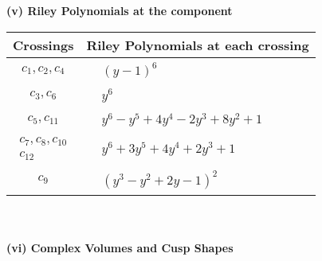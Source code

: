 \documentclass[1p]{elsarticle_modified}
\theoremstyle{definition}
\begin{document}
\newpage\renewcommand{\arraystretch}{1}
\flushleft \textbf{(v) Riley Polynomials at the component}\newline \\
\begin{tabular}{m{50pt}|m{274pt}}
Crossings & \hspace{64pt}Riley Polynomials at each crossing \\
\hline $$\begin{aligned}c_{1},c_{2},c_{4}\end{aligned}$$&$\begin{aligned}
&(y-1)^6
\end{aligned}$\\
\hline $$\begin{aligned}c_{3},c_{6}\end{aligned}$$&$\begin{aligned}
&y^6
\end{aligned}$\\
\hline $$\begin{aligned}c_{5},c_{11}\end{aligned}$$&$\begin{aligned}
&y^6- y^5+4 y^4-2 y^3+8 y^2+1
\end{aligned}$\\
\hline $$\begin{aligned}c_{7},c_{8},c_{10}\\c_{12}\end{aligned}$$&$\begin{aligned}
&y^6+3 y^5+4 y^4+2 y^3+1
\end{aligned}$\\
\hline $$\begin{aligned}c_{9}\end{aligned}$$&$\begin{aligned}
&(y^3- y^2+2 y-1)^2
\end{aligned}$\\
\hline
\end{tabular}\\~\\
\newpage\flushleft \textbf{(vi) Complex Volumes and Cusp Shapes}
\end{document}
